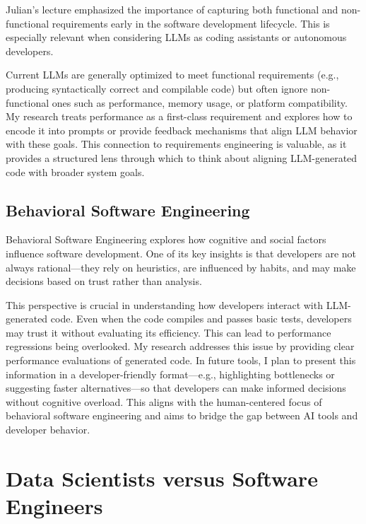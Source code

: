 \documentclass[11pt]{article}
\begin{document}
Julian's lecture emphasized the importance of capturing both functional and non-functional requirements early in the software development lifecycle. This is especially relevant when considering LLMs as coding assistants or autonomous developers.

Current LLMs are generally optimized to meet functional requirements (e.g., producing syntactically correct and compilable code) but often ignore non-functional ones such as performance, memory usage, or platform compatibility. My research treats performance as a first-class requirement and explores how to encode it into prompts or provide feedback mechanisms that align LLM behavior with these goals. This connection to requirements engineering is valuable, as it provides a structured lens through which to think about aligning LLM-generated code with broader system goals.

\subsection{Behavioral Software Engineering}

Behavioral Software Engineering explores how cognitive and social factors influence software development. One of its key insights is that developers are not always rational—they rely on heuristics, are influenced by habits, and may make decisions based on trust rather than analysis.

This perspective is crucial in understanding how developers interact with LLM-generated code. Even when the code compiles and passes basic tests, developers may trust it without evaluating its efficiency. This can lead to performance regressions being overlooked. My research addresses this issue by providing clear performance evaluations of generated code. In future tools, I plan to present this information in a developer-friendly format—e.g., highlighting bottlenecks or suggesting faster alternatives—so that developers can make informed decisions without cognitive overload. This aligns with the human-centered focus of behavioral software engineering and aims to bridge the gap between AI tools and developer behavior.


\section{Data Scientists versus Software Engineers}

\end{document}
